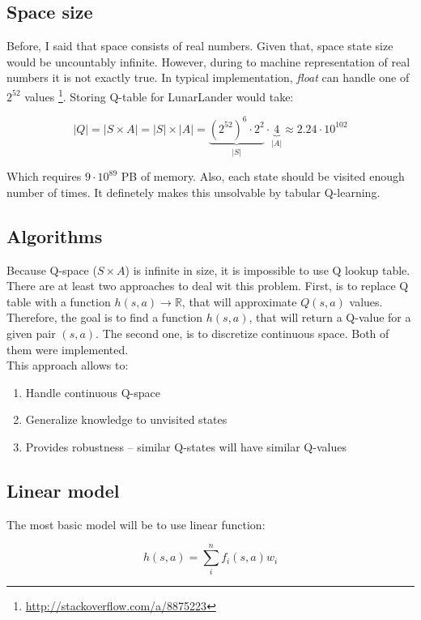 \documentclass[12pt]{article}
\begin{document}
\subsection{Space size}

Before, I said that space consists of real numbers. Given that, space state size  would be uncountably infinite. However, during to machine representation of real numbers it is not exactly true. In typical implementation, \emph{float} can handle one of $2^{52}$ values \footnote{\url{http://stackoverflow.com/a/8875223}}. Storing Q-table for LunarLander would take:

\begin{equation}
|Q| = |S \times A| = |S| \times |A| = \underbrace{{(2^{52})}^6 \cdot 2^2}_{|S|} \cdot \underbrace{4}_{|A|} \approx 2.24 \cdot 10^{102}
\end{equation}

Which requires $9 \cdot 10^{89}$ PB of memory. Also, each state should be visited enough number of times. It definetely makes this unsolvable by tabular Q-learning.

\subsection{Algorithms}

Because Q-space ($S \times A$) is infinite in size, it is impossible to use Q lookup table. There are at least two approaches to deal wit this problem. First, is to replace Q table with a function $h(s,a) \rightarrow \mathbb{R}$, that will approximate $Q(s, a)$ values. Therefore, the goal is to find a function $h(s, a)$, that will return a Q-value for a given pair $(s,a)$. The second one, is to discretize continuous space. Both of them were implemented.
\\[12pt]
This approach allows to:
\begin{enumerate}
\item Handle continuous Q-space
\item Generalize knowledge to unvisited states
\item Provides robustness – similar Q-states will have similar Q-values
\end{enumerate}

\subsection{Linear model}
The most basic model will be to use linear function:

\begin{equation}
h(s, a) = \sum_i^n f_i(s, a)w_i
\end{equation}
\end{document}
